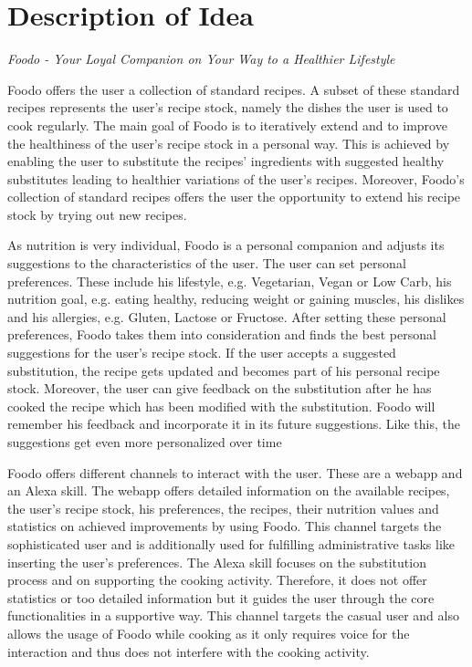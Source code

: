 \chapter{Description of Idea}
\begin{center}
\textit{Foodo - Your Loyal Companion on Your Way to a Healthier Lifestyle}
\end{center}

Foodo offers the user a collection of standard recipes. A subset of these standard recipes represents the user's recipe stock, namely the dishes the user is used to cook regularly. The main goal of Foodo is to iteratively extend and to improve the healthiness of the user's recipe stock in a personal way. This is achieved by enabling the user to substitute the recipes' ingredients with suggested healthy substitutes leading to healthier variations of the user's recipes. Moreover, Foodo's collection of standard recipes offers the user the opportunity to extend his recipe stock by trying out new recipes. 

As nutrition is very individual, Foodo is a personal companion and adjusts its suggestions to the characteristics of the user. The user can set personal preferences. These include his lifestyle, e.g. Vegetarian, Vegan or Low Carb, his nutrition goal, e.g. eating healthy, reducing weight or gaining muscles, his dislikes and his allergies, e.g. Gluten, Lactose or Fructose. After setting these personal preferences, Foodo takes them into consideration and finds the best personal suggestions for the user's recipe stock. If the user accepts a suggested substitution, the recipe gets updated and becomes part of his personal recipe stock. Moreover, the user can give feedback on the substitution after he has cooked the recipe which has been modified with the substitution. Foodo will remember his feedback and incorporate it in its future suggestions. Like this, the suggestions get even more personalized over time

Foodo offers different channels to interact with the user. These are a webapp and an Alexa skill. The webapp offers detailed information on the available recipes, the user's recipe stock, his preferences, the recipes, their nutrition values and statistics on achieved improvements by using Foodo. This channel targets the sophisticated user and is additionally used for fulfilling administrative tasks like inserting the user's preferences. The Alexa skill focuses on the substitution process and on supporting the cooking activity. Therefore, it does not offer statistics or too detailed information but it guides the user through the core functionalities in a supportive way. This channel targets the casual user and also allows the usage of Foodo while cooking as it only requires voice for the interaction and thus does not interfere with the cooking activity.



